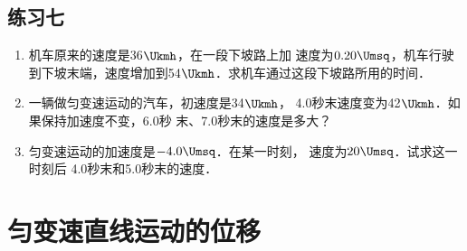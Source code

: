 \subsection*{练习七}
\begin{enumerate}
\item 机车原来的速度是36$\Ukmh$，在一段下坡路上加
速度为$0.20\Umsq$，机车行驶到下坡末端，速度增加到54$\Ukmh$．求机车通过这段下坡路所用的时间．
\item 一辆做匀变速运动的汽车，初速度是34$\Ukmh$，
4.0秒末速度变为42$\Ukmh$．如果保持加速度不变，6.0秒
末、7.0秒末的速度是多大？
\item 匀变速运动的加速度是$-4.0\Umsq$．在某一时刻，
速度为$20\Umsq$．试求这一时刻后 4.0秒末和5.0秒末的速度．
\end{enumerate}

\section{匀变速直线运动的位移}
 

